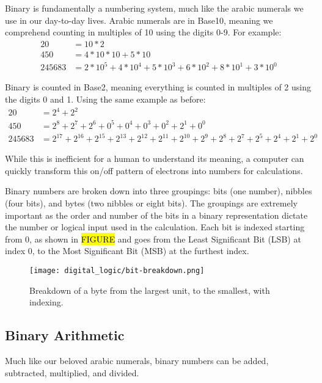 Binary is fundamentally a numbering system, much like the arabic numerals we use in our day-to-day lives.
Arabic numerals are in Base10, meaning we comprehend counting in multiples of 10 using the digits 0-9. For example:
\begin{align*}
    20     &= 10*2 \\
    450    &= 4*10*10 + 5*10 \\
    245683 &= 2*10^5 + 4*10^4 + 5*10^3 + 6*10^2 + 8*10^1 + 3*10^0
\end{align*}

Binary is counted in Base2, meaning everything is counted in multiples of 2 using the digits 0 and 1. Using the same example as before:
\begin{align*}
    20     &= 2^4 + 2^2 \\
    450    &= 2^8 + 2^7 + 2^6 + 0^5 + 0^4 + 0^3 + 0^2 + 2^1 + 0^0 \\
    245683 &= 2^{17} + 2^{16} + 2^{15} + 2^{13} + 2^{12} + 2^{11} + 2^{10} + 2^9 + 2^8 + 2^7 + 2^5 + 2^4 + 2^1 + 2^0
\end{align*}
        
While this is inefficient for a human to understand its meaning, a computer can quickly transform this on/off pattern of electrons into numbers for calculations.

Binary numbers are broken down into three groupings: bits (one number), nibbles (four bits), and bytes (two nibbles or eight bits). 
The groupings are extremely important as the order and number of the bits in a binary representation dictate the number or logical input used in the calculation.
Each bit is indexed starting from 0, as shown in \hl{FIGURE} and goes from the Least Significant Bit (LSB) at index 0, to the Most Significant Bit (MSB) at the furthest index. 

\begin{figure*}
    \texttt{[image: digital\_logic/bit-breakdown.png]}
    \caption[Byte Breakdown]{Breakdown of a byte from the largest unit, to the smallest, with indexing.}
\end{figure*}

    \subsection{Binary Arithmetic}
    Much like our beloved arabic numerals, binary numbers can be added, subtracted, multiplied, and divided.

